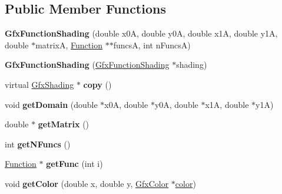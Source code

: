 \subsection*{Public Member Functions}
\begin{DoxyCompactItemize}
\item 
\mbox{\label{class_gfx_function_shading_a1bed8b3ef2837e282a96c881cac0d297}} 
{\bfseries Gfx\+Function\+Shading} (double x0A, double y0A, double x1A, double y1A, double $\ast$matrixA, \hyperlink{class_function}{Function} $\ast$$\ast$funcsA, int n\+FuncsA)
\item 
\mbox{\label{class_gfx_function_shading_a65717705f9246e2b01e445c78f33bd3c}} 
{\bfseries Gfx\+Function\+Shading} (\hyperlink{class_gfx_function_shading}{Gfx\+Function\+Shading} $\ast$shading)
\item 
\mbox{\label{class_gfx_function_shading_a352d3f6f2a4f3608915ff2db8bace410}} 
virtual \hyperlink{class_gfx_shading}{Gfx\+Shading} $\ast$ {\bfseries copy} ()
\item 
\mbox{\label{class_gfx_function_shading_a5ea3df911c84940f96a9eea771ff552c}} 
void {\bfseries get\+Domain} (double $\ast$x0A, double $\ast$y0A, double $\ast$x1A, double $\ast$y1A)
\item 
\mbox{\label{class_gfx_function_shading_a6acae9555d177c82c11222e7bd5f5e04}} 
double $\ast$ {\bfseries get\+Matrix} ()
\item 
\mbox{\label{class_gfx_function_shading_a0b663b659e4e139b5289e0c6e522990e}} 
int {\bfseries get\+N\+Funcs} ()
\item 
\mbox{\label{class_gfx_function_shading_ad7393d99cbf5fc13ddc8703fce849eca}} 
\hyperlink{class_function}{Function} $\ast$ {\bfseries get\+Func} (int i)
\item 
\mbox{\label{class_gfx_function_shading_ac25c5d5d716b86d7865f1b114a3bed90}} 
void {\bfseries get\+Color} (double x, double y, \hyperlink{struct_gfx_color}{Gfx\+Color} $\ast$\hyperlink{structcolor}{color})
\end{DoxyCompactItemize}
